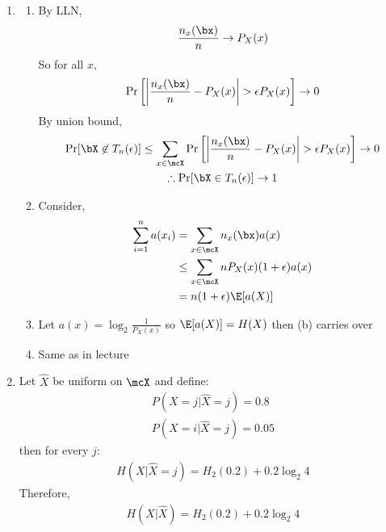 \documentclass[12pt, a4paper]{article}
\begin{document}
\begin{enumerate}
\begin{enumerate}
      \item Take the 3-symbol uniform source:
        \begin{align*}
          P_X(a) = P_X(b) = P_X(c) = \frac{1}{3}
        \end{align*}
        hence every sequence is of probability $3^{-n}$ and is typical by the argument in (a)

        Then note sequence of repeated $a$ has counts $(n, 0, 0)$ which are far from the averages of $(\frac{n}{3}, \frac{n}{3}, \frac{n}{3})$ but nonetheless typical.
    \end{enumerate}
\pagebreak
  \item 
    \begin{enumerate}
      \item By LLN,
        \begin{align*}
          \frac{n_x(\bx)}{n} \to P_X(x)
        \end{align*}
        So for all $x$,
        \begin{align*}
          \Pr\left[\left| \frac{n_x(\bx)}{n} - P_X(x)\right| > \epsilon P_X(x)\right] \to 0
        \end{align*}
        By union bound,
        \begin{gather*}
          \Pr[\bX \not\in T_n(\epsilon)] \leq \sum_{x\in\mcX}\Pr\left[\left| \frac{n_x(\bx)}{n} - P_X(x)\right| > \epsilon P_X(x)\right] \to 0\\ 
          \therefore \Pr[\bX \in T_n(\epsilon)] \to 1
        \end{gather*}

      \item Consider,
        \begin{align*}
          \sum^n_{i=1}a(x_i) &= \sum_{x\in\mcX}n_x(\bx)a(x)\\ 
                             &\leq \sum_{x\in\mcX}nP_X(x)(1+\epsilon)a(x)\\ 
                             &= n(1+\epsilon)\E[a(X)]
        \end{align*}

      \item Let $a(x)=\log_2 \frac{1}{P_X(x)}$ so $\E[a(X)] = H(X)$ then (b) carries over 

      \item Same as in lecture
    \end{enumerate}

  \item Let $\hat{X}$ be uniform on $\mcX$ and define:
    \begin{align*}
      P(X=j|\hat{X}=j) = 0.8\\ 
      P(X=i|\hat{X}=j) = 0.05
    \end{align*}
    then for every $j$:
    \begin{align*}
      H(X|\hat{X}=j) = H_2(0.2) + 0.2\log_2 4 
    \end{align*}
    Therefore, 
    \begin{align*}
      H(X|\hat{X}) = H_2(0.2) + 0.2\log_2 4
    \end{align*}


\end{enumerate}
\end{document}
